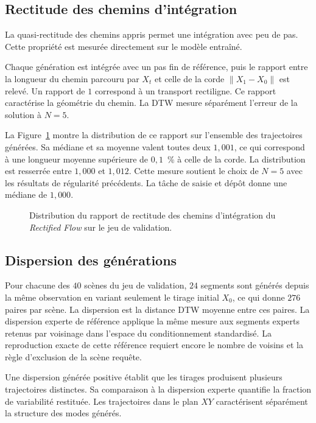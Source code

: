 \subsection*{Rectitude des chemins d'intégration}

La quasi-rectitude des chemins appris permet une intégration avec peu de pas. Cette propriété est mesurée directement sur le modèle entraîné.

Chaque génération est intégrée avec un pas fin de référence, puis le rapport entre la longueur du chemin parcouru par $X_t$ et celle de la corde $\|X_1-X_0\|$ est relevé. Un rapport de $1$ correspond à un transport rectiligne. Ce rapport caractérise la géométrie du chemin. La \ac{DTW} mesure séparément l'erreur de la solution à $N=5$.

La Figure~\ref{fig:fm_straightness} montre la distribution de ce rapport sur l'ensemble des trajectoires générées. Sa médiane et sa moyenne valent toutes deux $1{,}001$, ce qui correspond à une longueur moyenne supérieure de $0{,}1$~\% à celle de la corde. La distribution est resserrée entre $1{,}000$ et $1{,}012$. Cette mesure soutient le choix de $N=5$ avec les résultats de régularité précédents. La tâche de saisie et dépôt donne une médiane de $1{,}000$.

\begin{figure}[!htbp]
    \centering
    
    \caption{Distribution du rapport de rectitude des chemins d'intégration du \textit{Rectified Flow} sur le jeu de validation.}\label{fig:fm_straightness}
\end{figure}

\subsection*{Dispersion des générations}

Pour chacune des $40$ scènes du jeu de validation, $24$ segments sont générés depuis la même observation en variant seulement le tirage initial $X_0$, ce qui donne $276$ paires par scène. La dispersion est la distance \ac{DTW} moyenne entre ces paires. La dispersion experte de référence applique la même mesure aux segments experts retenus par voisinage dans l'espace du conditionnement standardisé. La reproduction exacte de cette référence requiert encore le nombre de voisins et la règle d'exclusion de la scène requête.

Une dispersion générée positive établit que les tirages produisent plusieurs trajectoires distinctes. Sa comparaison à la dispersion experte quantifie la fraction de variabilité restituée. Les trajectoires dans le plan $XY$ caractérisent séparément la structure des modes générés.

